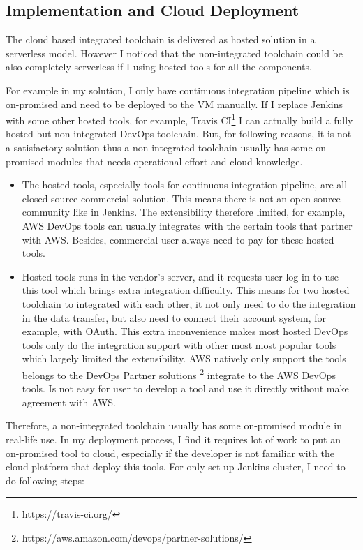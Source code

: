 \subsection{Implementation and Cloud Deployment}
The cloud based integrated toolchain is delivered as hosted solution in a serverless model. However I noticed that the non-integrated toolchain could be also completely serverless if I using hosted tools for all the components. 
\par
For example in my solution, I only have continuous integration pipeline which is on-promised and need to be deployed to the VM manually. If I replace Jenkins with some other hosted tools, for example, Travis CI\footnote{https://travis-ci.org/} I can actually build a fully hosted but non-integrated DevOps toolchain. But, for following reasons, it is not a satisfactory solution thus a non-integrated toolchain usually has some on-promised modules that needs operational effort and cloud knowledge.
\begin{itemize}
 \item The hosted tools, especially tools for continuous integration pipeline, are all closed-source commercial solution. This means there is not an open source community like in Jenkins. The extensibility therefore limited, for example, AWS DevOps tools can usually integrates with the certain tools that partner with AWS. Besides, commercial user always need to pay for these hosted tools.
 \item Hosted tools runs in the vendor's server, and it requests user log in to use this tool which brings extra integration difficulty. This means for two hosted toolchain to integrated with each other, it not only need to do the integration in the data transfer, but also need to connect their account system, for example, with OAuth. This extra inconvenience makes most hosted DevOps tools only do the integration support with other most most popular tools which largely limited the extensibility. AWS natively only support the tools belongs to the DevOps Partner solutions \footnote{https://aws.amazon.com/devops/partner-solutions/} integrate to the AWS DevOps tools. Is not easy for user to develop a tool and use it directly without make agreement with AWS.
\end{itemize}
Therefore, a non-integrated toolchain usually has some on-promised module in real-life use. In my deployment process, I find it requires lot of work to put an on-promised tool to cloud, especially if the developer is not familiar with the cloud platform that deploy this tools. For only set up Jenkins cluster, I need to do following steps:
